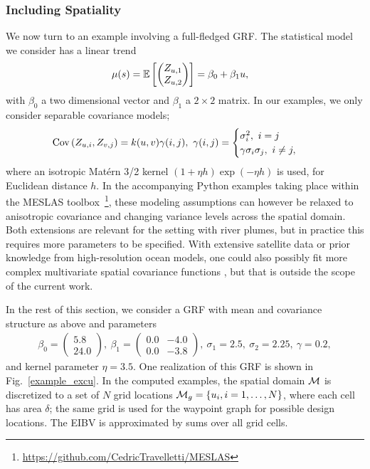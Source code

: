 \documentclass[aoas]{imsart}
\begin{document}
\subsubsection{Including Spatiality}

We now turn to an example involving a full-fledged GRF. The statistical model we consider has a linear trend
\begin{align*}
\mu(s)=\mathbb{E}\left[\begin{pmatrix}
Z_{\spatloc, 1}\\ Z_{\spatloc, 2}
\end{pmatrix}\right] &= \beta_0 + \beta_1 \spatloc,
\end{align*}
with $\beta_0$ a two dimensional vector and $\beta_1$ a $2\times 2$ matrix. In our examples, we only consider separable covariance models;
\begin{align*}
\textrm{Cov}\left(Z_{\spatloc, i}, Z_{v, j}\right) &= k(\spatloc, v) \gamma(i, j),~ \gamma(i, j) = \begin{cases} \sigma_i^2,~ i=j\\
   \gamma \sigma_i \sigma_j,~i\neq j,
        \end{cases}
\end{align*}
where an isotropic Mat\'{e}rn 3/2 kernel $(1+\eta h)\exp (-\eta h)$ is
used, for Euclidean distance $h$.  In the accompanying Python examples
taking place within the MESLAS
toolbox~\footnote{\url{https://github.com/CedricTravelletti/MESLAS}},
these modeling assumptions can however be relaxed to anisotropic
covariance and changing variance levels across the spatial
domain. Both extensions are relevant for the setting with river
plumes, but in practice this requires more parameters to be
specified. With extensive satellite data or prior knowledge from
high-resolution ocean models, one could also possibly fit more complex
multivariate spatial covariance functions
\citep{gneiting2010matern,genton2015cross}, but that is outside the
scope of the current work.

In the rest of this section, we consider a GRF with mean and
covariance structure as above and parameters
\begin{align*}
\beta_0 = \begin{pmatrix}
5.8\\ 24.0
\end{pmatrix}, ~ \beta_1 = \begin{pmatrix}
0.0 & -4.0\\
0.0 & -3.8
\end{pmatrix},~ \sigma_1 = 2.5,~ \sigma_2 = 2.25, ~ \gamma = 0.2,
\end{align*}
and kernel parameter $\eta=3.5$.
One realization of this GRF is shown in Fig.~\ref{example_excu}.
In the computed examples, the spatial domain $\mathcal{M}$ is
discretized to a set of $N$ grid locations
$\mathcal{M}_g = \{u_i, i=1,\ldots,N \}$, where each cell has area
$\delta$; the same grid is used for the waypoint graph for possible
design locations. The EIBV is approximated by sums over all grid
cells. 
\end{document}
